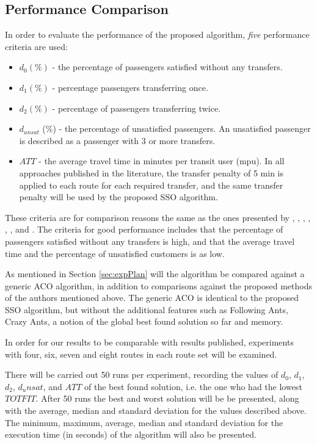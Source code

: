 \subsection{Performance Comparison}
\label{subsec:performanceComparison_setup}

In order to evaluate the performance of the proposed algorithm, \textit{five} performance criteria are used:
\begin{itemize}
\item $d_0 (\%)$ - the percentage of passengers satisfied without any transfers. 
\item $d_1 (\%)$ - percentage passengers transferring once. 
\item $d_2 (\%)$ - percentage of passengers transferring twice. 
\item $d_{unsat}$ (\%) - the percentage of unsatisfied passengers. An unsatisfied passenger is described as a passenger with 3 or more transfers. 
\item $ATT$  - the average travel time in minutes per transit user (mpu). In all approaches published in the literature, the transfer penalty of 5 min is applied to each route for each required transfer, and the same transfer penalty will be used by the proposed SSO algorithm.
\end{itemize}
These criteria are for comparison reasons the same as the ones presented by \citet{mandl79}, \citet{kechagiopoulos14}, \citet{kidwai98}, \citet{fan10}, \citet{chakroborty02}, \citet{zhang10}, and \citet{chew12}. The criteria for good performance includes that the percentage of passengers satisfied without any transfers is high, and that the average travel time and the percentage of unsatisfied customers is as low. 

As mentioned in Section \vref{sec:expPlan} will the algorithm be compared against a generic ACO algorithm, in addition to comparisons against the proposed methods of the authors mentioned above. The generic ACO is identical to the proposed SSO algorithm, but without the additional features such as Following Ants, Crazy Ants, a notion of the global best found solution so far and memory. 

In order for our results to be comparable with results published, experiments with four, six, seven and eight routes in each route set will be examined. 

There will be carried out 50 runs per experiment, recording the values of $d_0$, $d_1$, $d_2$, $d_unsat$, and $ATT$ of the best found solution, i.e. the one who had the lowest $TOTFIT$. After 50 runs the best and worst solution will be be presented, along with the average, median and standard deviation for the values described above. The minimum, maximum, average, median and standard deviation for the execution time (in seconds) of the algorithm will also be presented.  


